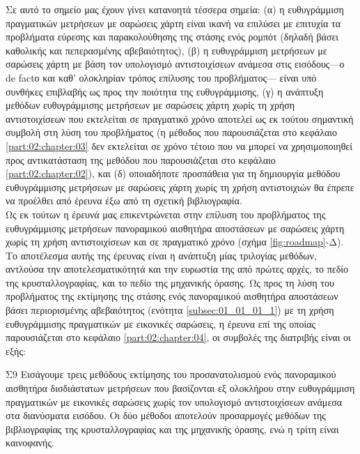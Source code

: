 Σε αυτό το σημείο μας έχουν γίνει κατανοητά τέσσερα σημεία: (α) η ευθυγράμμιση
πραγματικών μετρήσεων με σαρώσεις χάρτη είναι ικανή να επιλύσει με επιτυχία τα
προβλήματα εύρεσης και παρακολούθησης της στάσης ενός ρομπότ (δηλαδή βάσει
καθολικής και πεπερασμένης αβεβαιότητος), (β) η ευθυγράμμιση μετρήσεων με
σαρώσεις χάρτη με βάση τον υπολογισμό αντιστοιχίσεων ανάμεσα στις εισόδους---ο
de factο και καθ' ολοκληρίαν τρόπος επίλυσης του προβλήματος--- είναι υπό
συνθήκες επιβλαβής ως προς την ποιότητα της ευθυγράμμισης, (γ) η ανάπτυξη
μεθόδων ευθυγράμμισης μετρήσεων με σαρώσεις χάρτη χωρίς τη χρήση αντιστοιχίσεων
που εκτελείται σε πραγματικό χρόνο αποτελεί ως εκ τούτου σημαντική συμβολή στη
λύση του προβλήματος (η μέθοδος που παρουσιάζεται στο κεφάλαιο
\ref{part:02:chapter:03} δεν εκτελείται σε χρόνο τέτοιο που να μπορεί να
χρησιμοποιηθεί προς αντικατάσταση της μεθόδου που παρουσιάζεται στο κεφάλαιο
\ref{part:02:chapter:02}), και (δ) οποιαδήποτε προσπάθεια για τη δημιουργία
μεθόδου ευθυγράμμισης μετρήσεων με σαρώσεις χάρτη χωρίς τη χρήση αντιστοιχιών
θα έπρεπε να προέλθει από έρευνα έξω από τη σχετική βιβλιογραφία.\\



Ως εκ τούτων η έρευνά μας επικεντρώνεται στην επίλυση του προβλήματος της
ευθυγράμμισης μετρήσεων πανοραμικού αισθητήρα αποστάσεων με σαρώσεις χάρτη
χωρίς τη χρήση αντιστοιχίσεων και σε πραγματικό χρόνο (σχήμα
\ref{fig:roadmap}-Δ). Το αποτέλεσμα αυτής της έρευνας είναι η ανάπτυξη μίας
τριλογίας μεθόδων, αντλούσα την αποτελεσματικότητά και την ευρωστία της από
πρώτες αρχές, το πεδίο της κρυσταλλογραφίας, και το πεδίο της μηχανικής όρασης.
Ως προς τη λύση του προβλήματος της εκτίμησης της στάσης ενός πανοραμικού
αισθητήρα αποστάσεων βάσει περιορισμένης αβεβαιότητος (ενότητα
\ref{subsec:01_01_01_1}) με τη χρήση ευθυγράμμισης πραγματικών με εικονικές
σαρώσεις, η έρευνα επί της οποίας παρουσιάζεται στο κεφάλαιο
\ref{part:02:chapter:04}, οι συμβολές της διατριβής είναι οι εξής:

\begin{bw_box}
\begin{customcontribution}{Σ9}
  \label{contribution:09}
  Εισάγουμε τρεις μεθόδους εκτίμησης του προσανατολισμού ενός πανοραμικού
  αισθητήρα δισδιάστατων μετρήσεων που βασίζονται εξ ολοκλήρου στην
  ευθυγράμμιση πραγματικών με εικονικές σαρώσεις χωρίς τον υπολογισμό
  αντιστοιχίσεων ανάμεσα στα διανύσματα εισόδου. Οι δύο μέθοδοι αποτελούν
  προσαρμογές μεθόδων της βιβλιογραφίας της κρυσταλλογραφίας και της
  μηχανικής όρασης, ενώ η τρίτη είναι καινοφανής.
\end{customcontribution}
\end{bw_box}

